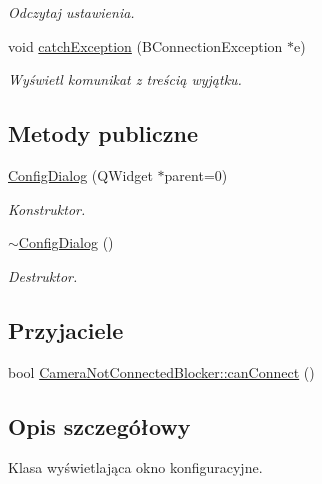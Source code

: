 \begin{DoxyCompactItemize}
\begin{DoxyCompactList}\small\item\em Odczytaj ustawienia. \item\end{DoxyCompactList}\item 
\hypertarget{class_config_dialog_a99f28a7e313ccc20892503afdc3191b9}{
void \hyperlink{class_config_dialog_a99f28a7e313ccc20892503afdc3191b9}{catchException} (BConnectionException $\ast$e)}
\label{class_config_dialog_a99f28a7e313ccc20892503afdc3191b9}

\begin{DoxyCompactList}\small\item\em Wyświetl komunikat z treścią wyjątku. \item\end{DoxyCompactList}\end{DoxyCompactItemize}
\subsection*{Metody publiczne}
\begin{DoxyCompactItemize}
\item 
\hyperlink{class_config_dialog_ad16df8ed2e55bd5cc55e3ef9040b8b93}{ConfigDialog} (QWidget $\ast$parent=0)
\begin{DoxyCompactList}\small\item\em Konstruktor. \item\end{DoxyCompactList}\item 
\hyperlink{class_config_dialog_a485badac4dffa04603f800bb9d396e1d}{$\sim$ConfigDialog} ()
\begin{DoxyCompactList}\small\item\em Destruktor. \item\end{DoxyCompactList}\end{DoxyCompactItemize}
\subsection*{Przyjaciele}
\begin{DoxyCompactItemize}
\item 
bool \hyperlink{class_config_dialog_a3b0963bb150b18a9cbd3b46187f7ea26}{CameraNotConnectedBlocker::canConnect} ()
\end{DoxyCompactItemize}


\subsection{Opis szczegółowy}
Klasa wyświetlająca okno konfiguracyjne. 

